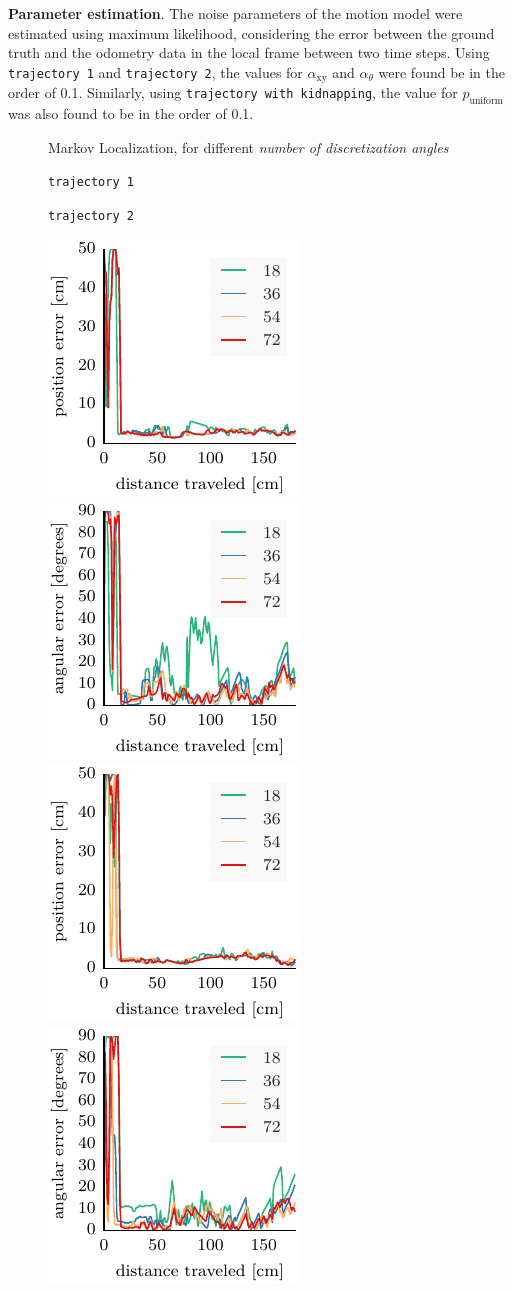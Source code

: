 \documentclass{svmult}
\begin{document}
\textbf{Parameter estimation}.
The noise parameters of the motion model were estimated using maximum likelihood, considering the error between the ground truth and the odometry data in the local frame between two time steps.
Using \texttt{trajectory~1} and \texttt{trajectory~2}, the values for  $\alpha_\mathrm{xy}$ and $\alpha_\theta$ were found be in the order of 0.1.
Similarly, using \texttt{trajectory with kidnapping}, the value for $p_\mathrm{uniform}$ was also found to be in the order of 0.1.


\begin{figure}

\begin{center}
Markov Localization, for different \emph{number of discretization angles}
\end{center}
\begin{minipage}{.5\columnwidth}
\begin{center}
\texttt{trajectory~1}
\end{center}
\end{minipage}
\hfill
\begin{minipage}{.5\columnwidth}
\begin{center}
\texttt{trajectory~2}
\end{center}
\end{minipage}

\includegraphics[width=.24\columnwidth]{ml-whole_random_1-xy}\hfill
\includegraphics[width=.24\columnwidth]{ml-whole_random_1-theta}\hfill
\includegraphics[width=.24\columnwidth]{ml-whole_random_2-xy}\hfill
\includegraphics[width=.24\columnwidth]{ml-whole_random_2-theta}


\end{figure}
\end{document}
